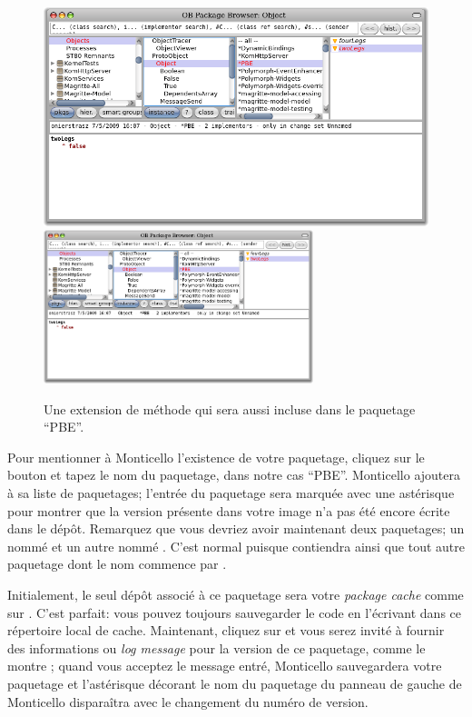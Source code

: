 \documentclass[a4paper,10pt,twoside]{book}
\begin{document}
\begin{figure}[btp]
	\begin{center}
	\ifluluelse
		{\includegraphics[width=\textwidth]{MCnewmethod}}
		{\includegraphics[width=0.7\textwidth]{MCnewmethod}}
	\end{center}
	\caption{Une extension de méthode qui sera aussi incluse dans le paquetage ``PBE''.}
\end{figure}

Pour mentionner à Monticello l'existence de votre paquetage, 
cliquez sur le bouton  et tapez le nom du paquetage,
dans notre cas ``PBE''.
Monticello ajoutera  à sa liste de paquetages;
l'entrée du paquetage sera marquée avec une astérisque pour
montrer que la version présente dans votre image n'a pas
été encore écrite dans le dépôt.
Remarquez que vous devriez avoir maintenant deux paquetages;
un nommé  et un autre nommé . C'est
normal puisque  contiendra  ainsi que
tout autre paquetage dont le nom commence par . %

Initialement, le seul dépôt associé à ce paquetage sera votre
\emph{package cache} comme sur .
C'est parfait: vous pouvez toujours sauvegarder le code en l'écrivant
dans ce répertoire local de cache.
Maintenant, cliquez sur  et vous serez invité à
fournir des informations ou \emph{log message} pour la version de ce 
paquetage, comme le montre ; 
quand vous acceptez le message entré, Monticello sauvegardera votre paquetage
et l'astérisque décorant le nom du paquetage du panneau de gauche
de Monticello disparaîtra avec le changement du numéro de version.
\end{document}
